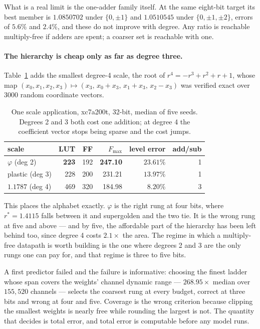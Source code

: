 What is a real limit is the one-adder family itself. At the same eight-bit
target its best member is $1.0850702$ under $\{0,\pm1\}$ and $1.0510545$ under
$\{0,\pm1,\pm2\}$, errors of $5.6\%$ and $2.4\%$, and these do not improve with
degree. Any ratio is reachable multiply-free if adders are spent; a coarser set
is reachable with one.

\paragraph{The hierarchy is cheap only as far as degree three.}
Table~\ref{tab:deg4} adds the smallest degree-4 scale, the root of
$r^4=-r^3+r^2+r+1$, whose map $(x_0,x_1,x_2,x_3)\mapsto(x_3,\,x_0{+}x_3,\,
x_1{+}x_3,\,x_2{-}x_3)$ was verified exact over $3000$ random coordinate
vectors.

\begin{table}[t]\centering
\caption{One scale application, xc7a200t, 32-bit, median of five seeds. Degrees
2 and 3 both cost one addition; at degree 4 the coefficient vector stops being
sparse and the cost jumps.}
\label{tab:deg4}
\begin{tabular}{lrrrrr}
\toprule
scale & LUT & FF & $F_{\max}$ & level error & add/sub \\
\midrule
$\varphi$ (deg 2)      & \textbf{223} & 192 & \textbf{247.10} & $23.61\%$ & 1 \\
plastic (deg 3)        & 228 & 200 & 231.21 & $13.97\%$ & 1 \\
$1.1787$ (deg 4)       & 469 & 320 & 184.98 & $\mathbf{8.20\%}$ & 3 \\
\bottomrule
\end{tabular}
\end{table}

This places the alphabet exactly. $\varphi$ is the right rung at four bits,
where $r^{*}=1.4115$ falls between it and supergolden and the two tie. It is the
wrong rung at five and above --- and by five, the affordable part of the
hierarchy has been left behind too, since degree 4 costs $2.1\times$ the area.
The regime in which a multiply-free datapath is worth building is the one where
degrees 2 and 3 are the only rungs one can pay for, and that regime is three to
five bits.

A first predictor failed and the failure is informative: choosing the finest
ladder whose span covers the weights' channel dynamic range --- $268.95\times$
median over $155{,}520$ channels --- selects the coarsest rung at every budget,
correct at three bits and wrong at four and five. Coverage is the wrong
criterion because clipping the smallest weights is nearly free while rounding
the largest is not. The quantity that decides is total error, and total error is
computable before any model runs.

